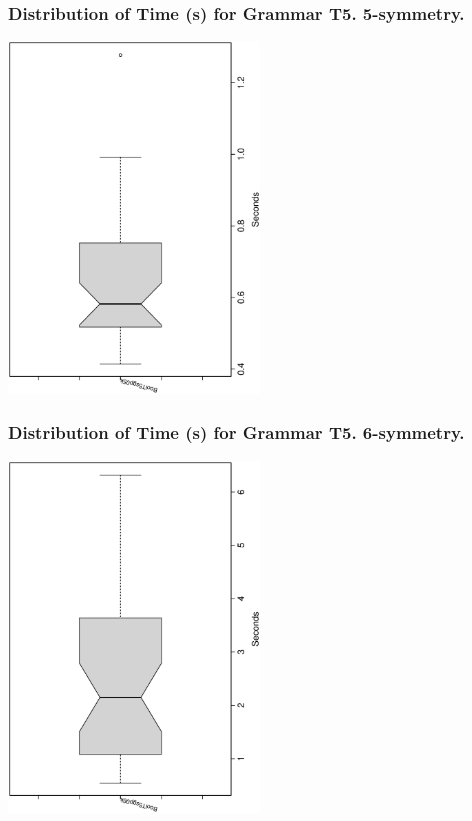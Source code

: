 \documentclass[18pt,c]{beamer}
\begin{document}
 \begin{frame}
 \frametitle{ Distribution of Time (s) for Grammar T5. 5-symmetry. }
 \begin{center}
\includegraphics[width=0.5\textwidth, angle=-90]
{ExpFboxplottSeconds003.eps}
 \end{center}
 \label{ExpFboxplottSeconds003.eps}  
 \end{frame}

 \begin{frame}
 \frametitle{ Distribution of Time (s) for Grammar T5. 6-symmetry. }
 \begin{center}
\includegraphics[width=0.5\textwidth, angle=-90]
{ExpFboxplottSeconds004.eps}
 \end{center}
 \label{ExpFboxplottSeconds004.eps}  
 \end{frame}
\end{document}
